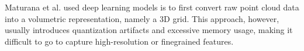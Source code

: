 Maturana et al. \cite{DBLP:conf/iros/MaturanaS15} used deep learning models is to first convert raw point cloud data into a volumetric representation, namely a 3D grid. This approach, however, usually introduces quantization artifacts and excessive memory usage, making it difficult to go to capture high-resolution or finegrained features.





 


